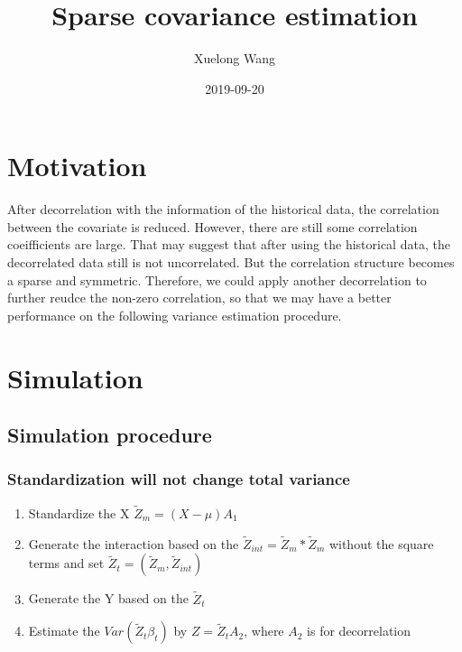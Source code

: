 \documentclass[]{article}
\title{Sparse covariance estimation}
\author{Xuelong Wang}
\date{2019-09-20}
\providecommand{\tightlist}{%
  \setlength{\itemsep}{0pt}\setlength{\parskip}{0pt}}
\begin{document}
\maketitle

{
\setcounter{tocdepth}{2}
\tableofcontents
}
\section{Motivation}\label{motivation}

After decorrelation with the information of the historical data, the
correlation between the covariate is reduced. However, there are still
some correlation coeifficients are large. That may suggest that after
using the historical data, the decorrelated data still is not
uncorrelated. But the correlation structure becomes a sparse and
symmetric. Therefore, we could apply another decorrelation to further
reudce the non-zero correlation, so that we may have a better
performance on the following variance estimation procedure.

\section{Simulation}\label{simulation}

\subsection{Simulation procedure}\label{simulation-procedure}

\subsubsection{Standardization will not change total
variance}\label{standardization-will-not-change-total-variance}

\begin{enumerate}
\def\labelenumi{\arabic{enumi}.}
\tightlist
\item
  Standardize the X \(\tilde{Z}_m = (X-\mu)A_1\)
\item
  Generate the interaction based on the
  \(\tilde{Z}_{int} = \tilde{Z}_m*\tilde{Z}_m\) without the square terms
  and set \(\tilde{Z}_t = (\tilde{Z}_m, \tilde{Z}_{int})\)
\item
  Generate the Y based on the \(\tilde{Z}_t\)
\item
  Estimate the \(Var(\tilde{Z}_t \beta_t)\) by \(Z = \tilde{Z}_tA_2\),
  where \(A_2\) is for decorrelation
\end{enumerate}
\end{document}
